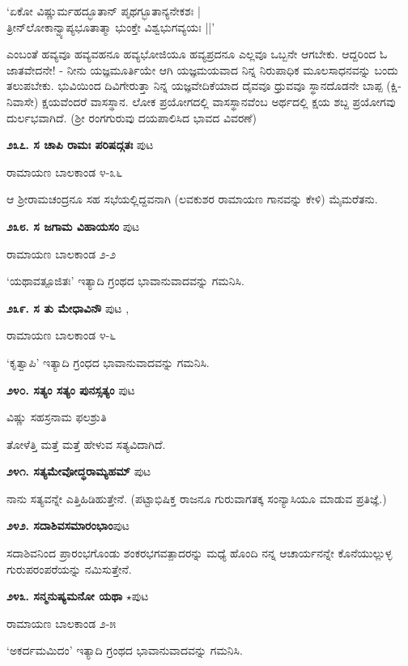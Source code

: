 \begin{shloka}
`ಏಕೋ ವಿಷ್ಣುರ್ಮಹದ್ಭೂತಾನ್ ಪೃಥಗ್ಭೂತಾನ್ಯನೇಕಶಃ |\\
ತ್ರೀನ್‌ಲೋಕಾನ್ವ್ಯಾಪ್ಯಭೂತಾತ್ಮಾ ಭುಂಕ್ತೇ ವಿಶ್ವಭುಗವ್ಯಯಃ ||'
\end{shloka}
ಎಂಬಂತೆ ಹವ್ಯವೂ ಹವ್ಯವಹನೂ ಹವ್ಯಭೋಜಿಯೂ ಹವ್ಯಪ್ರದನೂ ಎಲ್ಲವೂ ಒಬ್ಬನೇ ಆಗಬೇಕು. ಆದ್ದರಿಂದ ಓ ಜಾತವೇದನೇ! - ನೀನು ಯಜ್ಞಮೂರ್ತಿಯೇ ಆಗಿ ಯಜ್ಞಮಯವಾದ ನಿನ್ನ ನಿರುಪಾಧಿಕ ಮೂಲಸಾಧನವನ್ನು ಬಂದು ತಲುಪಬೇಕು. ಭುವಿಯಿಂದ ದಿವಿಗೇರುತ್ತಾ ನಿನ್ನ ಯಜ್ಞವೇದಿಕೆಯಾದ ದೈವವೂ ಧ್ರುವವೂ ಸ್ಥಾನದೊಡನೇ ಬಾಪ್ಪ (ಕ್ಷಿ-ನಿವಾಸೇ) ಕ್ಷಯವೆಂದರೆ ವಾಸಸ್ಥಾನ. ಲೋಕ ಪ್ರಯೋಗದಲ್ಲಿ ವಾಸಸ್ಥಾನವೆಂಬ ಅರ್ಥದಲ್ಲಿ ಕ್ಷಯ ಶಬ್ದ ಪ್ರಯೋಗವು ದುರ್ಲಭವಾಗಿದೆ. (ಶ್ರೀ ರಂಗಗುರುವು ದಯಪಾಲಿಸಿದ ಭಾವದ ವಿವರಣೆ)

\medskip
\noindent\textbf{೨೩೭. ಸ ಚಾಪಿ ರಾಮಃ ಪರಿಷದ್ಗತಃ} \hfill ಪುಟ \pageref{168cc}

\hfill ರಾಮಾಯಣ ಬಾಲಕಾಂಡ ೪-೩೬

ಆ ಶ್ರೀರಾಮಚಂದ್ರನೂ ಸಹ ಸಭೆಯಲ್ಲಿದ್ದವನಾಗಿ (ಲವಕುಶರ ರಾಮಾಯಣ ಗಾನವನ್ನು ಕೇಳಿ) ಮೈಮರೆತನು.

\medskip
\noindent\textbf{೨೩೮. ಸ ಜಗಾಮ ವಿಹಾಯಸಂ} \hfill ಪುಟ \pageref{163c}

\hfill ರಾಮಾಯಣ ಬಾಲಕಾಂಡ ೨-೨

`ಯಥಾವತ್ಪೂಜಿತಃ' ಇತ್ಯಾದಿ ಗ್ರಂಥದ ಭಾವಾನುವಾದವನ್ನು ಗಮನಿಸಿ.

\medskip
\noindent\textbf{೨೩೯. ಸ ತು ಮೇಧಾವಿನೌ} \hfill ಪುಟ \pageref{239},\pageref{240a}

\hfill ರಾಮಾಯಣ ಬಾಲಕಾಂಡ ೪-೬

`ಕೃತ್ವಾಪಿ' ಇತ್ಯಾದಿ ಗ್ರಂಧದ ಭಾವಾನುವಾದವನ್ನು ಗಮನಿಸಿ.

\medskip
\noindent\textbf{೨೪೦. ಸತ್ಯಂ ಸತ್ಯಂ ಪುನಸ್ಸತ್ಯಂ} \hfill ಪುಟ \pageref{130a}

\hfill ವಿಷ್ಣು ಸಹಸ್ರನಾಮ ಫಲಶ್ರುತಿ

ತೋಳೆತ್ತಿ ಮತ್ತೆ ಮತ್ತೆ ಹೇಳುವ ಸತ್ಯವಿದಾಗಿದೆ.

\medskip
\noindent\textbf{೨೪೧. ಸತ್ಯಮೇವೋದ್ಧರಾಮ್ಯಹಮ್} \hfill ಪುಟ \pageref{40}

ನಾನು ಸತ್ಯವನ್ನೇ ಎತ್ತಿಹಿಡಿಹುತ್ತೇನೆ. (ಪಟ್ಟಾಭಿಷಿಕ್ತ ರಾಜನೂ ಗುರುವಾಗತಕ್ಕ ಸಂನ್ಯಾಸಿಯೂ ಮಾಡುವ ಪ್ರತಿಜ್ಞೆ.)

\medskip
\noindent\textbf{೨೪೨. ಸದಾಶಿವಸಮಾರಂಭಾಂ}\hfill ಪುಟ \pageref{48c}

ಸದಾಶಿವನಿಂದ ಪ್ರಾರಂಭಗೊಂಡು ಶಂಕರಭಗವತ್ಪಾದರನ್ನು ಮಧ್ಯೆ ಹೊಂದಿ ನನ್ನ ಆಚಾರ್ಯನನ್ನೇ ಕೊನೆಯುಲ್ಲುಳ್ಳ ಗುರುಪರಂಪರೆಯನ್ನು ನಮಿಸುತ್ತೇನೆ.

\medskip
\noindent\textbf{೨೪೩. ಸನ್ಮನುಷ್ಯಮನೋ ಯಥಾ} $\star$\hfill ಪುಟ \pageref{197a}

\hfill ರಾಮಾಯಣ ಬಾಲಕಾಂಡ ೨-೫

`ಅಕರ್ದಮಮಿದಂ' ಇತ್ಯಾದಿ ಗ್ರಂಥದ ಭಾವಾನುವಾದವನ್ನು ಗಮನಿಸಿ.

